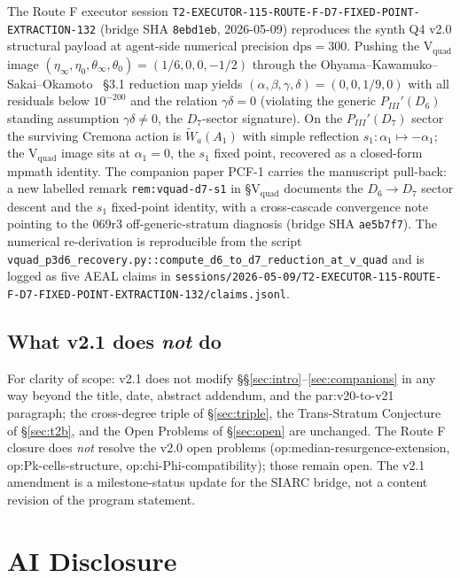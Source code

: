 \documentclass[11pt,a4paper]{article}
\theoremstyle{definition}
\theoremstyle{remark}
\begin{document}
The Route F executor session
\texttt{T2-EXECUTOR-115-ROUTE-F-D7-FIXED-POINT-EXTRACTION-132}
(bridge SHA \texttt{8ebd1eb}, 2026-05-09) reproduces the synth
Q4 v2.0 structural payload at agent-side numerical precision
$\mathrm{dps} = 300$. Pushing the V$_{\mathrm{quad}}$ image
$(\eta_\infty, \eta_0, \theta_\infty, \theta_0) = (1/6, 0, 0, -1/2)$
through the Ohyama--Kawamuko--Sakai--Okamoto~\cite{Ohyama2006}
\S 3.1 reduction map yields
$(\alpha, \beta, \gamma, \delta) = (0, 0, 1/9, 0)$ with all
residuals below $10^{-200}$ and the relation
$\gamma\delta = 0$ (violating the generic $P_{III}'(D_6)$ standing
assumption $\gamma\delta \neq 0$, the $D_7$-sector signature). On
the $P_{III}'(D_7)$ sector the surviving Cremona action is
$\widetilde{W}_a(A_1)$ with simple reflection
$s_1: \alpha_1 \mapsto -\alpha_1$; the V$_{\mathrm{quad}}$ image
sits at $\alpha_1 = 0$, the $s_1$ fixed point, recovered as a
closed-form mpmath identity. The companion paper PCF-1
\cite{PCF1} carries the manuscript pull-back: a new labelled
remark \verb|rem:vquad-d7-s1| in \cite{PCF1} \S V$_{\mathrm{quad}}$
documents the $D_6 \to D_7$ sector descent and the $s_1$ fixed-point
identity, with a cross-cascade convergence note pointing to the
069r3 off-generic-stratum diagnosis (bridge SHA \texttt{ae5b7f7}).
The numerical re-derivation is reproducible from the script
\texttt{vquad\_p3d6\_recovery.py::compute\_d6\_to\_d7\_reduction\_at\_v\_quad}
and is logged as five AEAL claims in
\texttt{sessions/2026-05-09/T2-EXECUTOR-115-ROUTE-F-D7-FIXED-POINT-EXTRACTION-132/claims.jsonl}.

\subsection{What v2.1 does \emph{not} do}
\label{sec:closure-cascade-out-of-scope}

For clarity of scope: v2.1 does not modify \S\S\ref{sec:intro}--\ref{sec:companions}
in any way beyond the title, date, abstract addendum, and the
\textsf{par:v20-to-v21} paragraph; the cross-degree triple of
\S\ref{sec:triple}, the Trans-Stratum Conjecture of
\S\ref{sec:t2b}, and the Open Problems of \S\ref{sec:open} are
unchanged. The Route F closure does \emph{not} resolve the v2.0
open problems
(\textsf{op:median-resurgence-extension}, \textsf{op:Pk-cells-structure},
\textsf{op:chi-Phi-compatibility}); those remain open. The v2.1
amendment is a milestone-status update for the SIARC bridge, not a
content revision of the program statement.

\section{AI Disclosure}
\label{sec:ai}
\end{document}
